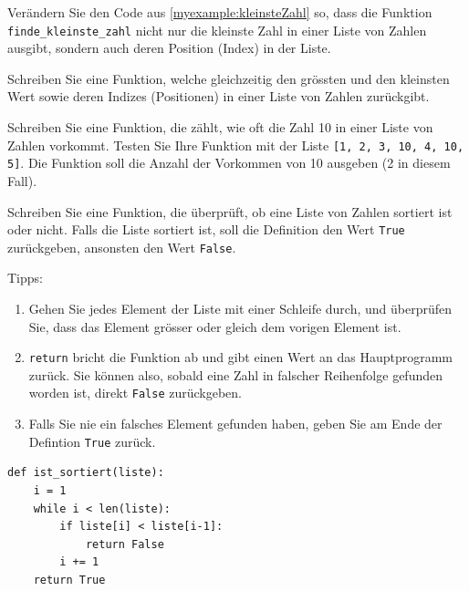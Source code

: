 \begin{myexercise}
    Verändern Sie den Code aus \cref{myexample:kleinsteZahl} so, dass die Funktion \lstinline|finde_kleinste_zahl| nicht nur die kleinste Zahl in einer Liste von Zahlen ausgibt, sondern auch deren Position (Index) in der Liste.
    \begin{myanswer}
        
    \end{myanswer}
\end{myexercise}

\begin{myexercise}
    Schreiben Sie eine Funktion, welche gleichzeitig den grössten und den kleinsten Wert sowie deren Indizes (Positionen) in einer Liste von Zahlen zurückgibt.
    \begin{myanswer}
        
    \end{myanswer}
\end{myexercise}

\begin{myexercise}
    Schreiben Sie eine Funktion, die zählt, wie oft die Zahl 10 in einer Liste von Zahlen vorkommt. Testen Sie Ihre Funktion mit der Liste \lstinline|[1, 2, 3, 10, 4, 10, 5]|. Die Funktion soll die Anzahl der Vorkommen von 10 ausgeben (2 in diesem Fall).
    \begin{myanswer}
        
    \end{myanswer}
\end{myexercise}

\begin{mysubmission}
    Schreiben Sie eine Funktion, die überprüft, ob eine Liste von Zahlen sortiert ist oder nicht. Falls die Liste sortiert ist, soll die Definition den Wert \lstinline|True| zurückgeben, ansonsten den Wert \lstinline|False|.

    Tipps:
    \begin{enumerate}
        \item Gehen Sie jedes Element der Liste mit einer Schleife durch, und überprüfen Sie, dass das Element grösser oder gleich dem vorigen Element ist.
        \item \lstinline|return| bricht die Funktion ab und gibt einen Wert an das Hauptprogramm zurück. Sie können also, sobald eine Zahl in falscher Reihenfolge gefunden worden ist, direkt \lstinline|False| zurückgeben.
        \item Falls Sie nie ein falsches Element gefunden haben, geben Sie am Ende der Defintion \lstinline|True| zurück.
    \end{enumerate}
    \begin{myanswer}
        \begin{lstlisting}
def ist_sortiert(liste):
    i = 1
    while i < len(liste):
        if liste[i] < liste[i-1]:
            return False
        i += 1
    return True
\end{lstlisting}
    \end{myanswer}
\end{mysubmission}

